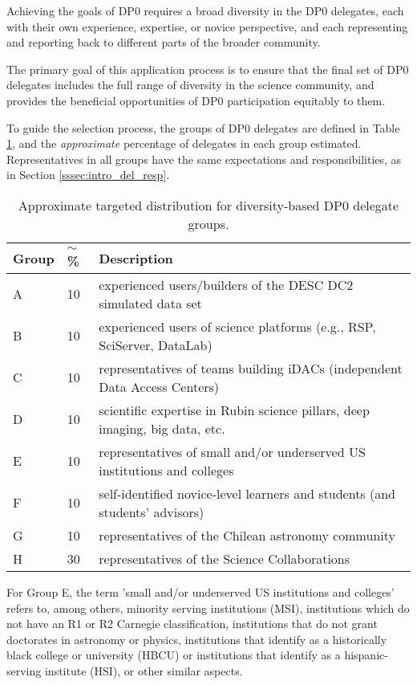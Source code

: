 \documentclass[DM,lsstdraft,authoryear,toc]{lsstdoc}
\begin{document}
Achieving the goals of DP0 requires a broad diversity in the DP0 delegates, each with their own experience, expertise, or novice perspective, and each representing and reporting back to different parts of the broader community.

The primary goal of this application process is to ensure that the final set of DP0 delegates includes the full range of diversity in the science community, and provides the beneficial opportunities of DP0 participation equitably to them.

To guide the selection process, the groups of DP0 delegates are defined in Table \ref{tab:delegate_groups}, and the \emph{approximate} percentage of delegates in each group estimated.
Representatives in all groups have the same expectations and responsibilities, as in Section \ref{sssec:intro_del_resp}.

\begin{table}[!h]
\centering
\caption{Approximate targeted distribution for diversity-based DP0 delegate groups.}\label{tab:delegate_groups}
\begin{tabular}{lll}
\hline
Group & $\sim$\% & Description \\
\hline \hline
A & 10 & experienced users/builders of the DESC DC2 simulated data set \\
B & 10 & experienced users of science platforms (e.g., RSP, SciServer, DataLab) \\
C & 10 & representatives of teams building iDACs (independent Data Access Centers) \\
D & 10 & scientific expertise in Rubin science pillars, deep imaging, big data, etc. \\
E & 10 & representatives of small and/or underserved US institutions and colleges \\
F & 10 & self-identified novice-level learners and students (and students' advisors) \\
G & 10 & representatives of the Chilean astronomy community \\
H & 30 & representatives of the Science Collaborations \\
\hline
\end{tabular}
\end{table}

For Group E, the term 'small and/or underserved US institutions and colleges' refers to, among others, minority serving institutions (MSI), institutions which do not have an R1 or R2 Carnegie classification, institutions that do not grant doctorates in astronomy or physics, institutions that identify as a historically black college or university (HBCU) or institutions that identify as a hispanic-serving institute (HSI), or other similar aspects.
\end{document}
